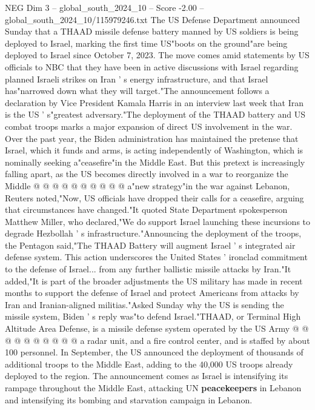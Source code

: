 \begin{textsample}{NEG Dim 3 – global\_south\_2024\_10 – Score -2.00 – global\_south\_2024\_10/115979246.txt}  \label{ex:f3_neg_095}
The US Defense Department announced Sunday that a THAAD missile defense battery manned by US soldiers is being deployed to Israel, marking the first time US"boots on the ground"are being deployed to Israel since October 7, 2023.
The move comes amid statements by US officials to NBC that they have been in active discussions with Israel regarding planned Israeli strikes on Iran ' s energy infrastructure, and that Israel has"narrowed down what they will target."The announcement follows a declaration by Vice President Kamala Harris in an interview last week that Iran is the US ' s"greatest adversary."The deployment of the THAAD battery and US combat troops marks a major expansion of direct US involvement in the war.
Over the past year, the Biden administration has maintained the pretense that Israel, which it funds and arms, is acting independently of Washington, which is nominally seeking a"ceasefire"in the Middle East.
But this pretext is increasingly falling apart, as the US becomes directly involved in a war to reorganize the Middle @ @ @ @ @ @ @ @ @ @ a"new strategy"in the war against Lebanon, Reuters noted,"Now, US officials have dropped their calls for a ceasefire, arguing that circumstances have changed."It quoted State Department spokesperson Matthew Miller, who declared,"We do support Israel launching these incursions to degrade Hezbollah ' s infrastructure."Announcing the deployment of the troops, the Pentagon said,"The THAAD Battery will augment Israel ' s integrated air defense system.
This action underscores the United States ' ironclad commitment to the defense of Israel... from any further ballistic missile attacks by Iran."It added,"It is part of the broader adjustments the US military has made in recent months to support the defense of Israel and protect Americans from attacks by Iran and Iranian-aligned militias."Asked Sunday why the US is sending the missile system, Biden ' s reply was"to defend Israel."THAAD, or Terminal High Altitude Area Defense, is a missile defense system operated by the US Army @ @ @ @ @ @ @ @ @ @ a radar unit, and a fire control center, and is staffed by about 100 personnel.
In September, the US announced the deployment of thousands of additional troops to the Middle East, adding to the 40,000 US troops already deployed to the region.
The announcement comes as Israel is intensifying its rampage throughout the Middle East, attacking UN \textbf{peacekeepers} in Lebanon and intensifying its bombing and starvation campaign in Lebanon.

\end{textsample}
